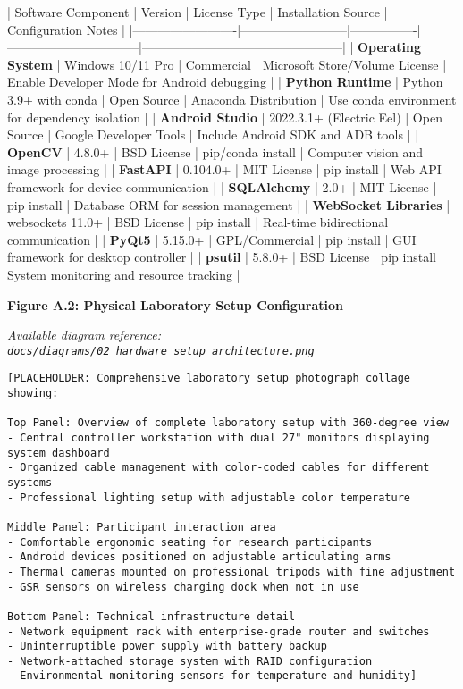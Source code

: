 \documentclass[11pt,a4paper]{article}
\begin{document}
| Software Component      | Version                  | License Type   | Installation Source            | Configuration Notes                            |
|-------------------------|--------------------------|----------------|--------------------------------|------------------------------------------------|
| \textbf{Operating System}    | Windows 10/11 Pro        | Commercial     | Microsoft Store/Volume License | Enable Developer Mode for Android debugging    |
| \textbf{Python Runtime}      | Python 3.9+ with conda   | Open Source    | Anaconda Distribution          | Use conda environment for dependency isolation |
| \textbf{Android Studio}      | 2022.3.1+ (Electric Eel) | Open Source    | Google Developer Tools         | Include Android SDK and ADB tools              |
| \textbf{OpenCV}              | 4.8.0+                   | BSD License    | pip/conda install              | Computer vision and image processing           |
| \textbf{FastAPI}             | 0.104.0+                 | MIT License    | pip install                    | Web API framework for device communication     |
| \textbf{SQLAlchemy}          | 2.0+                     | MIT License    | pip install                    | Database ORM for session management            |
| \textbf{WebSocket Libraries} | websockets 11.0+         | BSD License    | pip install                    | Real-time bidirectional communication          |
| \textbf{PyQt5}               | 5.15.0+                  | GPL/Commercial | pip install                    | GUI framework for desktop controller           |
| \textbf{psutil}              | 5.8.0+                   | BSD License    | pip install                    | System monitoring and resource tracking        |

\textbf{Figure A.2: Physical Laboratory Setup Configuration}

\textit{Available diagram reference: \texttt{docs/diagrams/02\_hardware\_setup\_architecture.png}}

\begin{verbatim}
[PLACEHOLDER: Comprehensive laboratory setup photograph collage showing:

Top Panel: Overview of complete laboratory setup with 360-degree view
- Central controller workstation with dual 27" monitors displaying system dashboard
- Organized cable management with color-coded cables for different systems
- Professional lighting setup with adjustable color temperature

Middle Panel: Participant interaction area
- Comfortable ergonomic seating for research participants
- Android devices positioned on adjustable articulating arms
- Thermal cameras mounted on professional tripods with fine adjustment
- GSR sensors on wireless charging dock when not in use

Bottom Panel: Technical infrastructure detail
- Network equipment rack with enterprise-grade router and switches
- Uninterruptible power supply with battery backup
- Network-attached storage system with RAID configuration
- Environmental monitoring sensors for temperature and humidity]
\end{verbatim}
\end{document}
